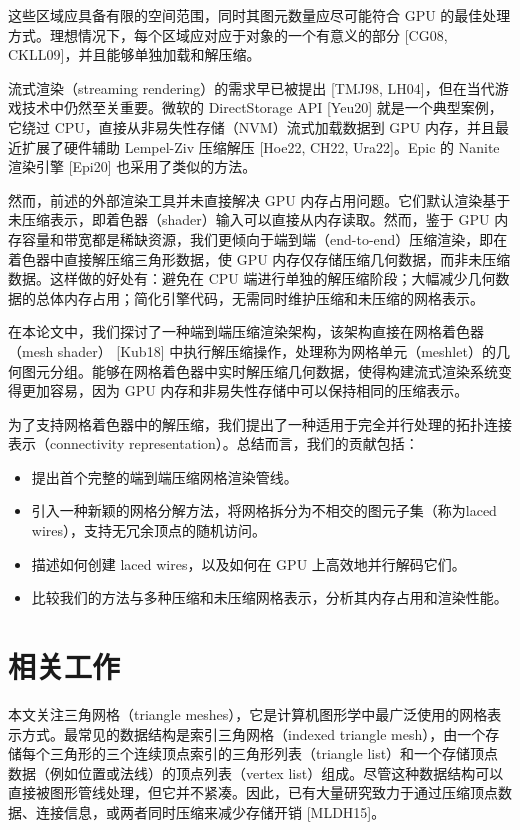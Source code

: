 这些区域应具备有限的空间范围，同时其图元数量应尽可能符合 GPU 的最佳处理方式。理想情况下，每个区域应对应于对象的一个有意义的部分 [CG08, CKLL09]，并且能够单独加载和解压缩。

流式渲染（streaming rendering）的需求早已被提出 [TMJ98, LH04]，但在当代游戏技术中仍然至关重要。微软的 DirectStorage API [Yeu20] 就是一个典型案例，它绕过 CPU，直接从非易失性存储（NVM）流式加载数据到 GPU 内存，并且最近扩展了硬件辅助 Lempel-Ziv 压缩解压 [Hoe22, CH22, Ura22]。Epic 的 Nanite 渲染引擎 [Epi20] 也采用了类似的方法。

然而，前述的外部渲染工具并未直接解决 GPU 内存占用问题。它们默认渲染基于未压缩表示，即着色器（shader）输入可以直接从内存读取。然而，鉴于 GPU 内存容量和带宽都是稀缺资源，我们更倾向于端到端（end-to-end）压缩渲染，即在着色器中直接解压缩三角形数据，使 GPU 内存仅存储压缩几何数据，而非未压缩数据。这样做的好处有：避免在 CPU 端进行单独的解压缩阶段；大幅减少几何数据的总体内存占用；简化引擎代码，无需同时维护压缩和未压缩的网格表示。

在本论文中，我们探讨了一种端到端压缩渲染架构，该架构直接在网格着色器（mesh shader） [Kub18] 中执行解压缩操作，处理称为网格单元（meshlet）的几何图元分组。能够在网格着色器中实时解压缩几何数据，使得构建流式渲染系统变得更加容易，因为 GPU 内存和非易失性存储中可以保持相同的压缩表示。

为了支持网格着色器中的解压缩，我们提出了一种适用于完全并行处理的拓扑连接表示（connectivity representation）。总结而言，我们的贡献包括：

\begin{itemize}

    \item 提出首个完整的端到端压缩网格渲染管线。
    \item 引入一种新颖的网格分解方法，将网格拆分为不相交的图元子集（称为laced wires），支持无冗余顶点的随机访问。
    \item 描述如何创建 laced wires，以及如何在 GPU 上高效地并行解码它们。
    \item 比较我们的方法与多种压缩和未压缩网格表示，分析其内存占用和渲染性能。

\end{itemize}

\section{相关工作}

本文关注三角网格（triangle meshes），它是计算机图形学中最广泛使用的网格表示方式。最常见的数据结构是索引三角网格（indexed triangle mesh），由一个存储每个三角形的三个连续顶点索引的三角形列表（triangle list）和一个存储顶点数据（例如位置或法线）的顶点列表（vertex list）组成。尽管这种数据结构可以直接被图形管线处理，但它并不紧凑。因此，已有大量研究致力于通过压缩顶点数据、连接信息，或两者同时压缩来减少存储开销 [MLDH15]。

